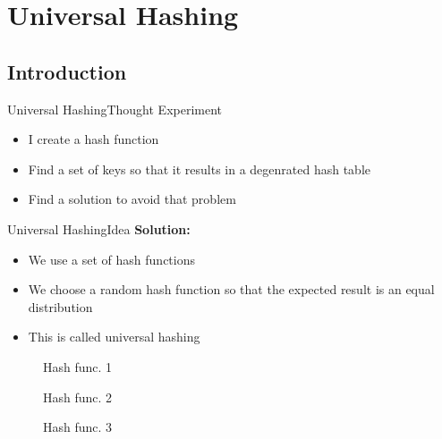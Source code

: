 \section{Universal Hashing}

\subsection{Introduction}

\begin{frame}{Universal Hashing}{Thought Experiment}
  \begin{itemize}
    \item
      I create a hash function
    \item
      Find a set of keys so that it results in a degenrated hash table
    \item
      Find a solution to avoid that problem
  \end{itemize}
\end{frame}


\begin{frame}{Universal Hashing}{Idea}
  \textbf{Solution:}
  \begin{itemize}
    \item
      We use a set of hash functions
    \item
      We choose a random hash function so that the expected result is an equal
      distribution
    \item
      This is called {\color{Mittel-Blau}universal hashing}
  \end{itemize}
  \begin{figure}[!b]
    \begin{minipage}{0.333\textwidth}%
      \centering%
      \caption{Hash func. 1}
    \end{minipage}%
    \begin{minipage}{0.333\textwidth}%
      \centering%
      \caption{Hash func. 2}
    \end{minipage}%
    \begin{minipage}{0.333\textwidth}%
      \centering%
      \caption{Hash func. 3}
    \end{minipage}%
  \end{figure}
\end{frame}

